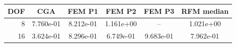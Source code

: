\begin{tabular}{rccccc}
\toprule
DOF & CGA & FEM P1 & FEM P2 & FEM P3 & RFM median \\
\midrule
8 & 7.760e-01 & 8.212e-01 & 1.161e+00 & -- & 1.021e+00 \\
16 & 3.624e-01 & 8.296e-01 & 6.749e-01 & 9.683e-01 & 7.962e-01 \\
\bottomrule
\end{tabular}
